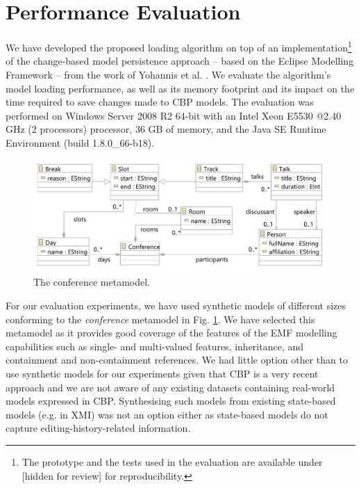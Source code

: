 \documentclass{llncs}
\begin{document}


\section{Performance Evaluation}
\label{sec:performance_evaluation}
We have developed the proposed loading algorithm on top of an implementation\footnote{The prototype and the tests used in the evaluation are available under [hidden for review] for reproducibility. %
} of the change-based model persistence approach -- based on the Eclipse Modelling Framework -- from the work of Yohannis et al. \cite{yohannis2017turning}. We evaluate the algorithm's model loading  performance, as well as its memory footprint and its impact on the time required to save changes made to CBP models. The evaluation was performed on Windows Server 2008 R2 64-bit with an Intel Xeon E5530 @2.40 GHz (2 processors) processor, 36 GB of memory, and the Java SE Runtime Environment (build 1.8.0\_66-b18).

\begin{figure}[htbp]
    \centering
    \includegraphics[width=0.9\linewidth]{conference_metamodel}
    \caption{The conference metamodel.}   
    \label{fig:node_metamodel}
\end{figure}

For our evaluation experiments, we have used synthetic models of different sizes conforming to the \emph{conference} metamodel in Fig. \ref{fig:node_metamodel}. We have selected this metamodel as it provides good coverage of the features of the EMF modelling capabilities such as single- and multi-valued features, inheritance, and containment and non-containment references. We had little option other than to use synthetic models for our experiments given that CBP is a very recent approach and we are not aware of any existing datasets containing real-world models expressed in CBP. Synthesising such models from existing state-based models (e.g. in XMI) was not an option either as state-based models do not capture editing-history-related information.    
\end{document}
